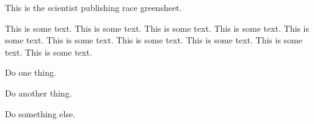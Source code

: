 \documentclass[green]{guildcamp3}
\begin{document}
	
	\name{\gSPublishing{}}
	
	
	
	
	This is the scientist publishing race greensheet.
	
	This is some text.  This is some text.  This is some text.  This is
	some text.  This is some text.  This is some text.  This is some text.
	This is some text.  This is some text.  This is some text.
	
	
	\begin{enum}[Directions]
		\item Do one thing.
		\item Do another thing.
		\item Do something else.
	\end{enum}
	
	
\end{document}

